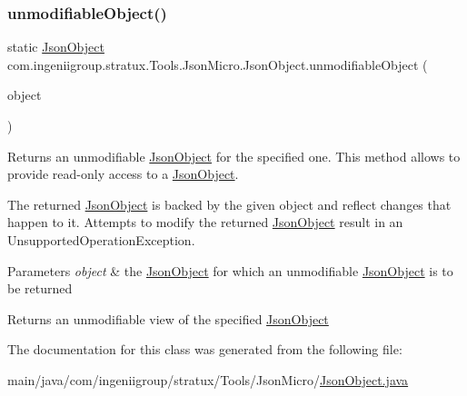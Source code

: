 \subsubsection{\texorpdfstring{unmodifiable\+Object()}{unmodifiableObject()}}
{\footnotesize\ttfamily static \hyperlink{classcom_1_1ingeniigroup_1_1stratux_1_1_tools_1_1_json_micro_1_1_json_object}{Json\+Object} com.\+ingeniigroup.\+stratux.\+Tools.\+Json\+Micro.\+Json\+Object.\+unmodifiable\+Object (\begin{DoxyParamCaption}\item[{\hyperlink{classcom_1_1ingeniigroup_1_1stratux_1_1_tools_1_1_json_micro_1_1_json_object}{Json\+Object}}]{object }\end{DoxyParamCaption})\hspace{0.3cm}{\ttfamily [static]}}

Returns an unmodifiable \hyperlink{classcom_1_1ingeniigroup_1_1stratux_1_1_tools_1_1_json_micro_1_1_json_object}{Json\+Object} for the specified one. This method allows to provide read-\/only access to a \hyperlink{classcom_1_1ingeniigroup_1_1stratux_1_1_tools_1_1_json_micro_1_1_json_object}{Json\+Object}. 

The returned \hyperlink{classcom_1_1ingeniigroup_1_1stratux_1_1_tools_1_1_json_micro_1_1_json_object}{Json\+Object} is backed by the given object and reflect changes that happen to it. Attempts to modify the returned \hyperlink{classcom_1_1ingeniigroup_1_1stratux_1_1_tools_1_1_json_micro_1_1_json_object}{Json\+Object} result in an {\ttfamily Unsupported\+Operation\+Exception}. 


\begin{DoxyParams}{Parameters}
{\em object} & the \hyperlink{classcom_1_1ingeniigroup_1_1stratux_1_1_tools_1_1_json_micro_1_1_json_object}{Json\+Object} for which an unmodifiable \hyperlink{classcom_1_1ingeniigroup_1_1stratux_1_1_tools_1_1_json_micro_1_1_json_object}{Json\+Object} is to be returned \\
\hline
\end{DoxyParams}
\begin{DoxyReturn}{Returns}
an unmodifiable view of the specified \hyperlink{classcom_1_1ingeniigroup_1_1stratux_1_1_tools_1_1_json_micro_1_1_json_object}{Json\+Object} 
\end{DoxyReturn}


The documentation for this class was generated from the following file\+:\begin{DoxyCompactItemize}
\item 
main/java/com/ingeniigroup/stratux/\+Tools/\+Json\+Micro/\hyperlink{_json_object_8java}{Json\+Object.\+java}\end{DoxyCompactItemize}
